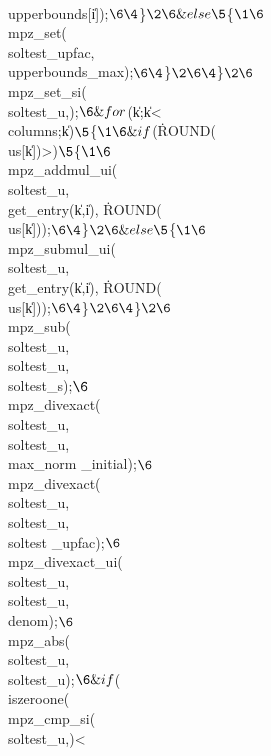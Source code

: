 \\{upperbounds}[\|i]);{}$\6
\4${}\}{}$\2\6
\&{else}\5
${}\{{}$\1\6
${}\\{mpz\_set}(\\{soltest\_upfac},\\{upperbounds\_max});{}$\6
\4${}\}{}$\2\6
\4${}\}{}$\2\6
${}\\{mpz\_set\_si}(\\{soltest\_u},);{}$\6
\&{for} ${}(\|k\K{};{}$ ${}\|k<\\{columns};{}$ ${}\|k\PP){}$\5
${}\{{}$\1\6
\&{if} ${}(\.{ROUND}(\\{us}[\|k])>){}$\5
${}\{{}$\1\6
${}\\{mpz\_addmul\_ui}(\\{soltest\_u},\\{get\_entry}(\|k,\|i),%
\.{ROUND}(\\{us}[\|k]));{}$\6
\4${}\}{}$\2\6
\&{else}\5
${}\{{}$\1\6
${}\\{mpz\_submul\_ui}(\\{soltest\_u},\\{get\_entry}(\|k,\|i),%
\.{ROUND}(\\{us}[\|k]));{}$\6
\4${}\}{}$\2\6
\4${}\}{}$\2\6
${}\\{mpz\_sub}(\\{soltest\_u},\\{soltest\_u},\\{soltest\_s});{}$\6
${}\\{mpz\_divexact}(\\{soltest\_u},\\{soltest\_u},\\{max\_norm%
\_initial});{}$\6
${}\\{mpz\_divexact}(\\{soltest\_u},\\{soltest\_u},\\{soltest%
\_upfac});{}$\6
${}\\{mpz\_divexact\_ui}(\\{soltest\_u},\\{soltest\_u},\\{denom});{}$\6
${}\\{mpz\_abs}(\\{soltest\_u},\\{soltest\_u});{}$\6
\&{if} ${}(\R\\{iszeroone}\W(\\{mpz\_cmp\_si}(\\{soltest\_u},)<\V%
